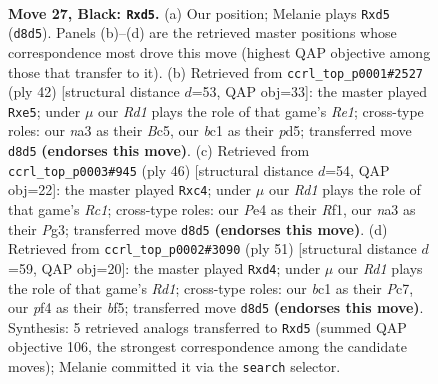 \documentclass[11pt]{article}
\begin{document}
\clearpage

\begin{figure}[p]\centering
\begin{subfigure}{0.46\textwidth}\centering
\resizebox{\linewidth}{!}{%
\newchessgame
\chessboard[
  setfen={1r1r4/pp4k1/6pp/2pB4/4pP1P/N3PbK1/PP6/1RB5 b - - 0 27},
  showmover=false,
  pgfstyle=straightmove, color=movearrow, markmove={d8-d5}
]}
\caption{}
\end{subfigure}\hfill
\begin{subfigure}{0.46\textwidth}\centering
\resizebox{\linewidth}{!}{%
\newchessgame
\chessboard[
  setfen={r3r3/2p2kpp/2p1b3/2Bpb3/p7/6P1/PPP2PP1/1R2R1K1 w - - 0 22},
  showmover=false,
  pgfstyle=straightmove, color=movearrow, markmove={e1-e5}
]}
\caption{}
\end{subfigure}
\\[4pt]
\begin{subfigure}{0.46\textwidth}\centering
\resizebox{\linewidth}{!}{%
\newchessgame
\chessboard[
  setfen={r3kbr1/8/2p2B1p/p4pp1/1pbP4/6P1/PP3P1P/2R2RK1 w q - 0 24},
  showmover=false,
  pgfstyle=straightmove, color=movearrow, markmove={c1-c4}
]}
\caption{}
\end{subfigure}\hfill
\begin{subfigure}{0.46\textwidth}\centering
\resizebox{\linewidth}{!}{%
\newchessgame
\chessboard[
  setfen={1r1r2k1/p1p1b1p1/7p/n3PB1P/2pB4/P4N2/1P3PP1/5RK1 b - - 5 26},
  showmover=false,
  pgfstyle=straightmove, color=movearrow, markmove={d8-d4}
]}
\caption{}
\end{subfigure}
\caption{\textbf{Move 27, Black: \texttt{Rxd5}.} (a) Our position; Melanie plays \texttt{Rxd5} (\texttt{d8d5}). Panels (b)--(d) are the retrieved master positions whose correspondence most drove this move (highest QAP objective among those that transfer to it). (b) Retrieved from \texttt{ccrl\_top\_p0001\#2527} (ply 42) [structural distance $d$=53, QAP obj=33]: the master played \texttt{Rxe5}; under $\mu$ our \emph{Rd1} plays the role of that game's \emph{Re1}; cross-type roles: our \emph{n}a3 as their \emph{B}c5, our \emph{b}c1 as their \emph{p}d5; transferred move \texttt{d8d5} \textbf{(endorses this move)}. (c) Retrieved from \texttt{ccrl\_top\_p0003\#945} (ply 46) [structural distance $d$=54, QAP obj=22]: the master played \texttt{Rxc4}; under $\mu$ our \emph{Rd1} plays the role of that game's \emph{Rc1}; cross-type roles: our \emph{P}e4 as their \emph{R}f1, our \emph{n}a3 as their \emph{P}g3; transferred move \texttt{d8d5} \textbf{(endorses this move)}. (d) Retrieved from \texttt{ccrl\_top\_p0002\#3090} (ply 51) [structural distance $d$=59, QAP obj=20]: the master played \texttt{Rxd4}; under $\mu$ our \emph{Rd1} plays the role of that game's \emph{Rd1}; cross-type roles: our \emph{b}c1 as their \emph{P}c7, our \emph{p}f4 as their \emph{b}f5; transferred move \texttt{d8d5} \textbf{(endorses this move)}. Synthesis: 5 retrieved analogs transferred to \texttt{Rxd5} (summed QAP objective 106, the strongest correspondence among the candidate moves); Melanie committed it via the \texttt{search} selector.}
\label{fig:thought-m53}
\end{figure}
\end{document}
